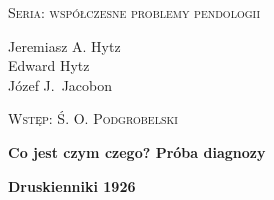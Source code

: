 \documentclass[a4paper]{article}
\begin{document}
\begin{titlepage}
\begin{center} \scshape \large Seria: współczesne problemy pendologii
\end{center}
\vspace{30mm}

\begin{Large}
\begin{flushright}
Jeremiasz A. Hytz \\ Edward Hytz \\ Józef J.~Jacobon
\end{flushright}
\end{Large}

\vspace{3mm}
\begin{raggedright}
\scshape Wstęp: Ś. O. Podgrobelski \par
\end{raggedright}
\vfill

\begin{center}
\Huge \sffamily \bfseries Co jest czym czego? Próba diagnozy
\end{center}
\vfill \vfill

\begin{raggedleft}
\normalsize \textsf{\textbf{Druskienniki 1926}} \par
\end{raggedleft}
\end{titlepage}
\end{document}
